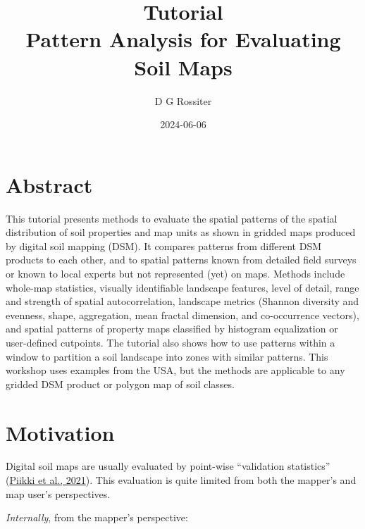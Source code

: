 \documentclass[
  letterpaper,
  DIV=11,
  numbers=noendperiod]{scrartcl}
\title{Tutorial\\
Pattern Analysis for Evaluating Soil Maps}
\author{D G Rossiter}
\date{2024-06-06}
\renewcommand*\contentsname{Table of contents}
\newcommand\contentsname{Table of contents}
\begin{document}
\maketitle
\ifdefined\Shaded\renewenvironment{Shaded}{\begin{tcolorbox}[boxrule=0pt, interior hidden, frame hidden, breakable, sharp corners, borderline west={3pt}{0pt}{shadecolor}, enhanced]}{\end{tcolorbox}}\fi

\renewcommand*\contentsname{Table of contents}
{
\hypersetup{linkcolor=}
\setcounter{tocdepth}{3}
\tableofcontents
}
\hypertarget{abstract}{%
\section{Abstract}\label{abstract}}

This tutorial presents methods to evaluate the spatial patterns of the
spatial distribution of soil properties and map units as shown in
gridded maps produced by digital soil mapping (DSM). It compares
patterns from different DSM products to each other, and to spatial
patterns known from detailed field surveys or known to local experts but
not represented (yet) on maps. Methods include whole-map statistics,
visually identifiable landscape features, level of detail, range and
strength of spatial autocorrelation, landscape metrics (Shannon
diversity and evenness, shape, aggregation, mean fractal dimension, and
co-occurrence vectors), and spatial patterns of property maps classified
by histogram equalization or user-defined cutpoints. The tutorial also
shows how to use patterns within a window to partition a soil landscape
into zones with similar patterns. This workshop uses examples from the
USA, but the methods are applicable to any gridded DSM product or
polygon map of soil classes.

\hypertarget{motivation}{%
\section{Motivation}\label{motivation}}

Digital soil maps are usually evaluated by point-wise ``validation
statistics''
(\protect\hyperlink{ref-piikkiPerspectivesValidationDigital2021}{Piikki
et al., 2021}). This evaluation is quite limited from both the mapper's
and map user's perspectives.

\emph{Internally}, from the mapper's perspective:
\end{document}
